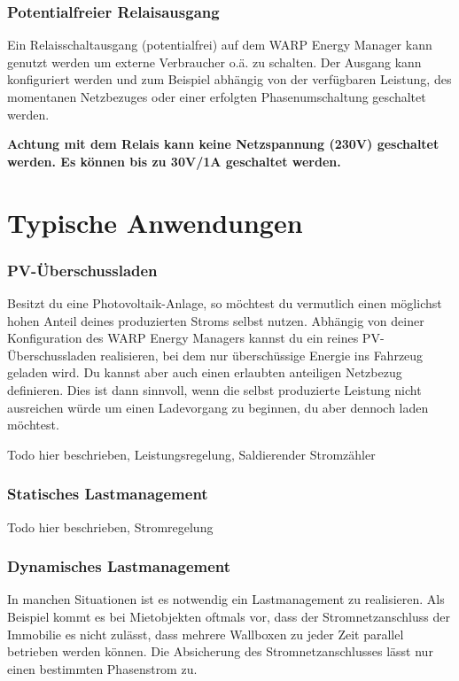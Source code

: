 \documentclass[a4paper,10pt]{article}
\begin{document}
\begin{multicols*}{2}
	\subsubsection{Potentialfreier Relaisausgang}
	Ein Relaisschaltausgang (potentialfrei) auf dem WARP Energy Manager kann
	genutzt werden um externe Verbraucher o.ä. zu schalten. Der Ausgang kann
	konfiguriert werden und zum Beispiel abhängig von der verfügbaren Leistung,
	des momentanen Netzbezuges oder einer erfolgten Phasenumschaltung geschaltet
	werden.

	\textbf{Achtung mit dem Relais kann keine Netzspannung (230V) geschaltet
	werden. Es können bis zu 30V/1A geschaltet werden.}

	\section{Typische Anwendungen}

	\subsubsection{PV-Überschussladen}
	Besitzt du eine Photovoltaik-Anlage, so möchtest du vermutlich einen
	möglichst hohen Anteil deines produzierten Stroms selbst nutzen. Abhängig
	von deiner Konfiguration des WARP Energy Managers kannst du ein reines
	PV-Überschussladen realisieren, bei dem nur überschüssige Energie ins
	Fahrzeug geladen wird. Du kannst aber auch einen erlaubten anteiligen Netzbezug
	definieren. Dies ist dann sinnvoll, wenn die selbst produzierte Leistung
	nicht ausreichen würde um einen Ladevorgang zu beginnen, du aber dennoch
	laden möchtest.

	Todo hier beschrieben, Leistungsregelung, Saldierender Stromzähler

	\subsubsection{Statisches Lastmanagement}

	Todo hier beschrieben, Stromregelung

	\subsubsection{Dynamisches Lastmanagement}
	In manchen Situationen ist es notwendig ein Lastmanagement zu realisieren. 
	Als Beispiel kommt es bei Mietobjekten oftmals vor, dass der
	Stromnetzanschluss der Immobilie es nicht zulässt, dass mehrere Wallboxen
	zu jeder Zeit parallel betrieben werden können. Die Absicherung des
	Stromnetzanschlusses lässt nur einen bestimmten Phasenstrom zu.


\end{multicols*}
\end{document}
